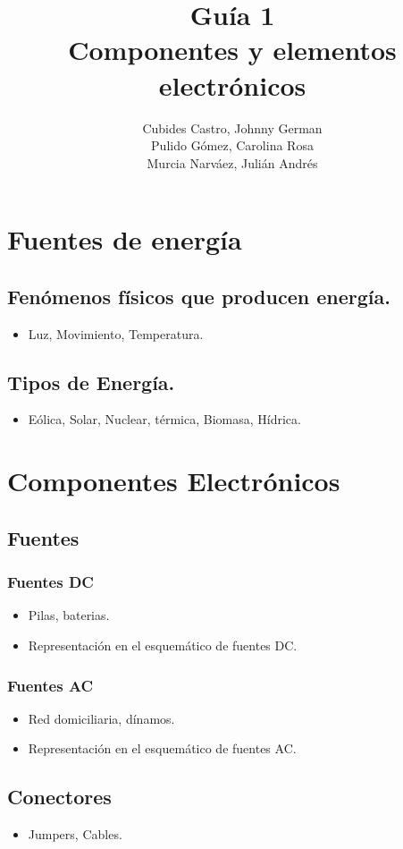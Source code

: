 \documentclass{article}
\title{Guía 1\\Componentes y elementos electrónicos}
\author{Cubides Castro, Johnny German \\
        Pulido Gómez, Carolina Rosa\\Murcia Narváez, Julián Andrés}
\begin{document}
\maketitle

\section{Fuentes de energía}
\subsection{Fenómenos físicos que producen energía.} 
\begin{itemize}
\item Luz, Movimiento, Temperatura.
\end{itemize}
\subsection{Tipos de Energía.}
\begin{itemize}
\item Eólica, Solar, Nuclear, térmica, Biomasa, Hídrica.
\end{itemize}
\section{Componentes Electrónicos}
\subsection{Fuentes}
\subsubsection{Fuentes DC}
\begin{itemize}
\item Pilas, baterias.
\item Representación en el esquemático de fuentes DC.
\end{itemize}
\subsubsection{Fuentes AC}
\begin{itemize}
\item Red domiciliaria, dínamos.
\item Representación en el esquemático de fuentes AC.
\end{itemize}
\subsection{Conectores}
\begin{itemize}
\item Jumpers, Cables.
\end{itemize}
\end{document}
